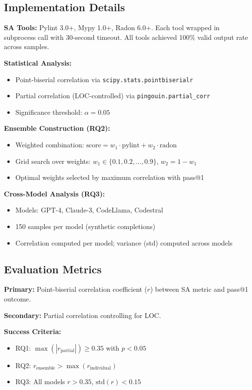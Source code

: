 \subsection{Implementation Details}

\textbf{SA Tools:} Pylint 3.0+, Mypy 1.0+, Radon 6.0+. Each tool wrapped in subprocess call with 30-second timeout. All tools achieved 100\% valid output rate across samples.

\textbf{Statistical Analysis:}
\begin{itemize}
\item Point-biserial correlation via \texttt{scipy.stats.pointbiserialr}
\item Partial correlation (LOC-controlled) via \texttt{pingouin.partial\_corr}
\item Significance threshold: $\alpha=0.05$
\end{itemize}

\textbf{Ensemble Construction (RQ2):}
\begin{itemize}
\item Weighted combination: $\text{score} = w_1 \cdot \text{pylint} + w_2 \cdot \text{radon}$
\item Grid search over weights: $w_1 \in \{0.1, 0.2, \ldots, 0.9\}$, $w_2 = 1-w_1$
\item Optimal weights selected by maximum correlation with pass@1
\end{itemize}

\textbf{Cross-Model Analysis (RQ3):}
\begin{itemize}
\item Models: GPT-4, Claude-3, CodeLlama, Codestral
\item 150 samples per model (synthetic completions)
\item Correlation computed per model; variance (std) computed across models
\end{itemize}

\subsection{Evaluation Metrics}

\textbf{Primary:} Point-biserial correlation coefficient ($r$) between SA metric and pass@1 outcome.

\textbf{Secondary:} Partial correlation controlling for LOC.

\textbf{Success Criteria:}
\begin{itemize}
\item RQ1: $\max(|r_{\text{partial}}|) \geq 0.35$ with $p < 0.05$
\item RQ2: $r_{\text{ensemble}} > \max(r_{\text{individual}})$
\item RQ3: All models $r > 0.35$, $\text{std}(r) < 0.15$
\end{itemize}

